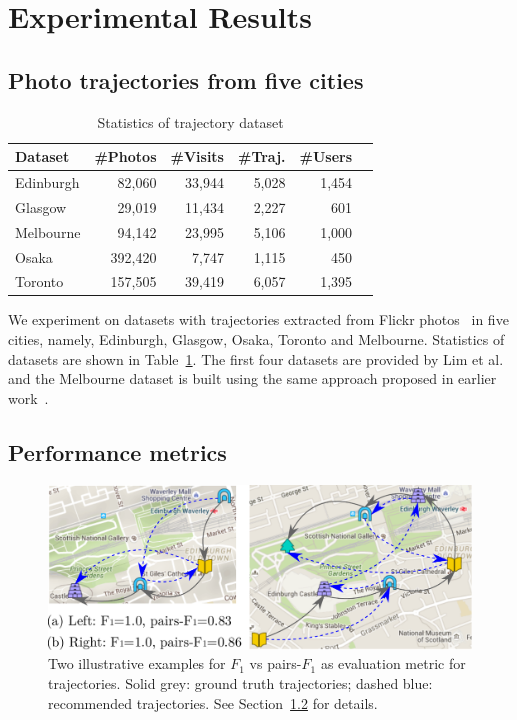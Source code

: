 
\section{Experimental Results}
\label{sec:experiment}
\secmoveup

\subsection{Photo trajectories from five cities}
\label{sec:dataset}
\secmoveup

\begin{table}
\caption{Statistics of trajectory dataset}
\label{tab:data}
\centering
\begin{tabular}{l*{5}{r}} \hline
\textbf{Dataset} & \textbf{\#Photos} & \textbf{\#Visits} & \textbf{\#Traj.} & \textbf{\#Users} \\ \hline
Edinburgh & 82,060 & 33,944 & 5,028 & 1,454 \\
Glasgow & 29,019 & 11,434 & 2,227 & 601 \\
Melbourne & 94,142 & 23,995 & 5,106 & 1,000 \\
Osaka & 392,420 & 7,747 & 1,115 & 450 \\
Toronto & 157,505 & 39,419 & 6,057 & 1,395 \\
\hline
\end{tabular}\captionmoveup
\end{table}


We experiment on datasets with trajectories extracted from Flickr photos~\cite{thomee2016yfcc100m} in five cities, 
namely, Edinburgh, Glasgow, Osaka, Toronto and Melbourne.
Statistics of datasets are shown in Table~\ref{tab:data}.
The first four datasets are provided by Lim et al.~\cite{ijcai15} and the Melbourne dataset is built using
the same approach proposed in earlier work~\cite{ht10, ijcai15}.

\subsection{Performance metrics}
\label{sec:metric}
\secmoveup

\begin{figure}[t]
	\centering
	\includegraphics[width=\columnwidth]{fig/pairF1.pdf}
	\caption{Two illustrative examples for $F_1$ vs pairs-$F_1$ as evaluation metric for trajectories. Solid grey: ground truth trajectories; dashed blue: recommended trajectories.
    See Section~\ref{sec:metric} for details.}
	\label{fig:pairf1}\captionmoveup
\end{figure}


